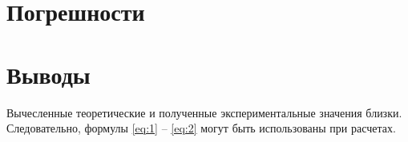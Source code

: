 \section{Погрешности}

\section{Выводы}

Вычесленные теоретические и полученные экспериментальные значения близки. Следовательно, формулы \ref{eq:1} -- \ref{eq:2} могут быть использованы при расчетах.

